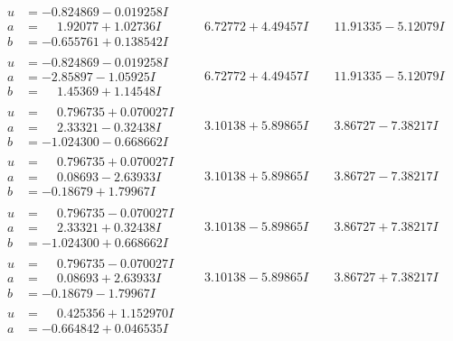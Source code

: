 \documentclass[1p]{elsarticle_modified}
\theoremstyle{definition}
\begin{document}
$$\begin{array}{c|c|c}
\begin{aligned}
u &= -0.824869 - 0.019258 I \\
a &= \phantom{-}1.92077 + 1.02736 I \\
b &= -0.655761 + 0.138542 I\end{aligned}
 & \phantom{-}6.72772 + 4.49457 I & \phantom{-}11.91335 - 5.12079 I \\ \hline\begin{aligned}
u &= -0.824869 - 0.019258 I \\
a &= -2.85897 - 1.05925 I \\
b &= \phantom{-}1.45369 + 1.14548 I\end{aligned}
 & \phantom{-}6.72772 + 4.49457 I & \phantom{-}11.91335 - 5.12079 I \\ \hline\begin{aligned}
u &= \phantom{-}0.796735 + 0.070027 I \\
a &= \phantom{-}2.33321 - 0.32438 I \\
b &= -1.024300 - 0.668662 I\end{aligned}
 & \phantom{-}3.10138 + 5.89865 I & \phantom{-}3.86727 - 7.38217 I \\ \hline\begin{aligned}
u &= \phantom{-}0.796735 + 0.070027 I \\
a &= \phantom{-}0.08693 - 2.63933 I \\
b &= -0.18679 + 1.79967 I\end{aligned}
 & \phantom{-}3.10138 + 5.89865 I & \phantom{-}3.86727 - 7.38217 I \\ \hline\begin{aligned}
u &= \phantom{-}0.796735 - 0.070027 I \\
a &= \phantom{-}2.33321 + 0.32438 I \\
b &= -1.024300 + 0.668662 I\end{aligned}
 & \phantom{-}3.10138 - 5.89865 I & \phantom{-}3.86727 + 7.38217 I \\ \hline\begin{aligned}
u &= \phantom{-}0.796735 - 0.070027 I \\
a &= \phantom{-}0.08693 + 2.63933 I \\
b &= -0.18679 - 1.79967 I\end{aligned}
 & \phantom{-}3.10138 - 5.89865 I & \phantom{-}3.86727 + 7.38217 I \\ \hline\begin{aligned}
u &= \phantom{-}0.425356 + 1.152970 I \\
a &= -0.664842 + 0.046535 I \\

\end{aligned}
\end{array}$$
\end{document}
